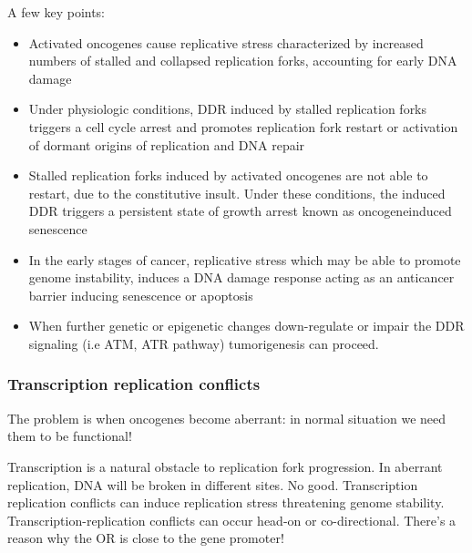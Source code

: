 A few key points: 
\begin{itemize}
\item Activated oncogenes cause replicative stress
characterized by increased numbers of stalled and collapsed replication
forks, accounting for early DNA damage
\item Under physiologic conditions,
DDR induced by stalled replication forks triggers a cell cycle arrest
and promotes replication fork restart or activation of dormant origins
of replication and DNA repair
\item Stalled replication forks induced by
activated oncogenes are not able to restart, due to the constitutive
insult. Under these conditions, the induced DDR triggers a persistent
state of growth arrest known as oncogeneinduced senescence
\item In the
early stages of cancer, replicative stress which may be able to promote
genome instability, induces a DNA damage response acting as an
anticancer barrier inducing senescence or apoptosis
\item When further
genetic or epigenetic changes down-regulate or impair the DDR signaling
(i.e ATM, ATR pathway) tumorigenesis can proceed.
\end{itemize}

\hypertarget{transcription-replication-conflicts}{%
\subsubsection{Transcription replication
conflicts}\label{transcription-replication-conflicts}}

The problem is when oncogenes become aberrant: in normal situation we
need them to be functional!

Transcription is a natural obstacle to replication fork progression. In
aberrant replication, DNA will be broken in different sites. No good.
Transcription replication conflicts can induce replication stress
threatening genome stability. Transcription-replication conflicts can
occur head-on or co-directional. There's a reason why the OR is close to
the gene promoter!

